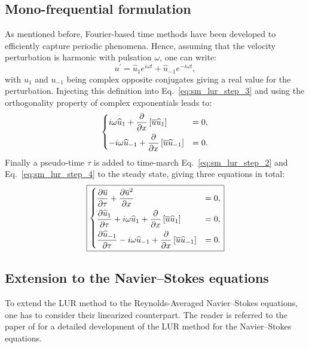 \subsection{Mono-frequential formulation}
As mentioned before, Fourier-based time methods have been developed to efficiently
capture periodic phenomena.
Hence, assuming that the velocity perturbation is harmonic with 
pulsation $\omega$, one can write:
\begin{equation}
	u^\prime = \widehat{u}_1 e^{i \omega t} + \widehat{u}_{-1} e^{-i \omega t},
\end{equation}
with $u_1$ and $u_{-1}$ being complex opposite conjugates giving a
real value for the perturbation.
Injecting this definition into Eq.~\eqref{eq:sm_lur_step_3} and using
the orthogonality property of complex exponentials leads
to:
\begin{equation}
	\begin{dcases}
		i \omega \widehat{u}_1 +
		\frac{\partial}{\partial x} \left[
		\overline{u} \widehat{u}_1 \right] &= 
		0, \\
		-i \omega \widehat{u}_{-1} +
		\frac{\partial}{\partial x} \left[
		\overline{u} \widehat{u}_{-1} \right] &= 
		0.
	\end{dcases}
	\label{eq:sm_lur_step_4}
\end{equation}
Finally a pseudo-time $\tau$ is added to time-march 
Eq.~\eqref{eq:sm_lur_step_2} and Eq.~\eqref{eq:sm_lur_step_4}
to the steady state, giving three equations in total:
\begin{equation}
	\fbox{$
	\begin{dcases}
		\frac{\partial \overline{u}}{\partial \tau} +
		\frac{\partial 
			\overline{u}^2}{\partial x} &= 0, \\
		\frac{\partial \widehat{u}_1}{\partial \tau} +
		i \omega \widehat{u}_1 +
			\frac{\partial}{\partial x} \left[
			\overline{u} \widehat{u}_1 \right] &= 
			0, \\
		\frac{\partial \widehat{u}_{-1}}{\partial \tau}
		-i \omega \widehat{u}_{-1} +
			\frac{\partial}{\partial x} \left[
			\overline{u} \widehat{u}_{-1} \right] &= 
			0.
	\end{dcases}
	$}
\end{equation}

\subsection{Extension to the Navier--Stokes equations}
To extend the LUR method to the Reynolds-Averaged
Navier--Stokes equations, one has to consider
their linearized counterpart.
The reader is referred to the paper of \citet{Clark2000} for
a detailed development of the LUR method for the Navier--Stokes
equations.

